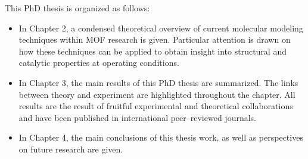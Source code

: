 This PhD thesis is organized as follows:
\begin{itemize}
\item In Chapter 2, a condensed theoretical overview of current molecular modeling techniques within MOF research is given. Particular attention is drawn on how these techniques can be applied to obtain insight into structural and catalytic properties at operating conditions.
\item In Chapter 3, the main results of this PhD thesis are summarized. The links between theory and experiment are highlighted throughout the chapter. All results are the result of fruitful experimental and theoretical collaborations and have been published in international peer--reviewed journals. 
\item In Chapter 4, the main conclusions of this thesis work, as well as perspectives on future research are given.
\end{itemize}

\clearpage{\pagestyle{empty}\cleardoublepage}
